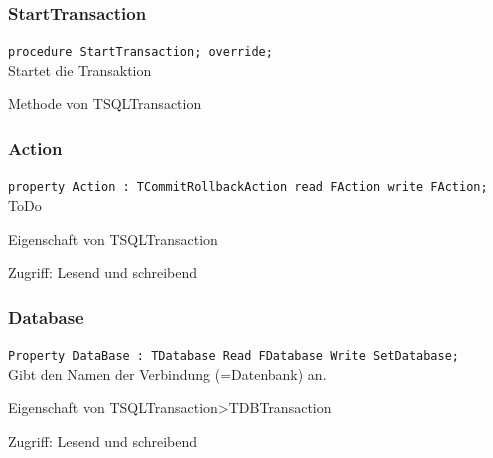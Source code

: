 \subsubsection{StartTransaction}
\begin{description}
  \item \texttt{procedure StartTransaction; override;}\\Startet die Transaktion
  \begin{description}
    \item Methode von TSQLTransaction
  \end{description}
\end{description}

\subsubsection{Action}
\begin{description}
  \item \texttt{property Action : TCommitRollbackAction read FAction write FAction;}\\ToDo
  \begin{description}
    \item Eigenschaft von TSQLTransaction
  \end{description}
  \begin{description}
    \item Zugriff: Lesend und schreibend
  \end{description}
\end{description}

\subsubsection{Database}
\begin{description}
  \item \texttt{Property DataBase : TDatabase Read FDatabase Write SetDatabase;}\\Gibt den Namen der Verbindung (=Datenbank) an.
  \begin{description}
    \item Eigenschaft von TSQLTransaction>TDBTransaction
  \end{description}
  \begin{description}
    \item Zugriff: Lesend und schreibend
  \end{description}
\end{description}

